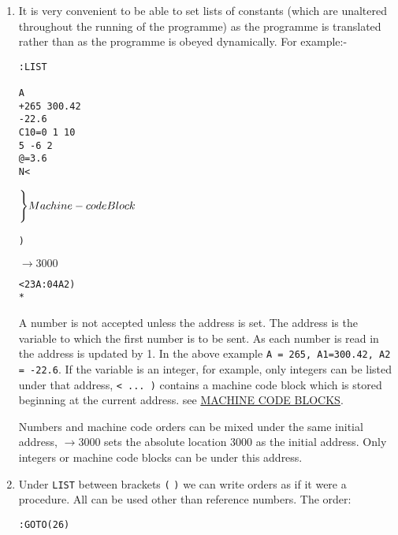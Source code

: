 \documentclass[10pt, a4paper, oneside]{article}
\newcommand{\myuline}[1]{\uline{#1}}
\newcommand{\mytt}[1]{\texttt{\scriptsize #1}}
\newcommand{\mytt}[1]{\texttt{\small #1}}
\begin{document}
\begin{multicols}{2}
\begin{enumerate}
\end{enumerate}

\renewcommand{\labelenumi}{(\roman{enumi})}
\begin{enumerate}

\item It is very convenient to be able to set lists of
constants (which are unaltered throughout the running
of the programme) as the programme is translated
rather than as the programme is obeyed dynamically.  For
example:-

\noindent\begin{minipage}{\columnwidth}
\begin{lstlisting}
:LIST

A
+265 300.42
-22.6
C10=0 1 10
5 -6 2
@=3.6
N<
\end{lstlisting}
\hspace{1.5cm}\begin{math}
\Biggl\}{ \\
Machine-code \\
Block \\
}
\end{math}
\begin{lstlisting}
)
\end{lstlisting}
$\rightarrow 3000$
\begin{lstlisting}
<23A:04A2)
*
\end{lstlisting}
\end{minipage}

A number is not accepted unless the address is set.  The
address is the variable to which the first number is
to be sent.  As each number is read in the address is
updated by 1.  In the above example \mytt{A = 265, A1=300.42,
A2 = -22.6}.  If the variable is an integer, for example,
only integers can be listed under that address,
\mytt{< ... )} contains a machine code block which is stored
beginning at the current address. see \myuline{MACHINE CODE BLOCKS}.

Numbers and machine code orders can be mixed under
the same initial address, $\rightarrow 3000$ sets the absolute
location 3000 as the initial address.  Only integers or
machine code blocks can be under this address.

\item Under \mytt{LIST} between brackets \mytt{(} \hspace{2cm} \mytt{)} we can write
orders as if it were a procedure.  All
can be used other than reference numbers.
The order:

\begin{addmargin}[1cm]{1em}%
\begin{lstlisting}
:GOTO(26)
\end{lstlisting}
\end{addmargin}


\end{enumerate}
\end{multicols}
\end{document}
